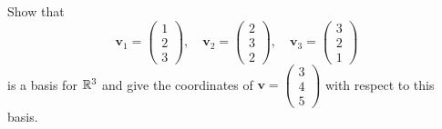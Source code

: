 \documentclass[10pt, a4paper]{article}
\newcommand{\mbf}[1]{\mathbf{#1}}
\begin{document}
\begin{example}
    Show that 
    \[
    \mbf{v}_1 = \begin{pmatrix}
        1 \\ 2 \\ 3
    \end{pmatrix},\quad\mbf{v}_2 = \begin{pmatrix}
        2 \\ 3 \\ 2
    \end{pmatrix},\quad\mbf{v}_3 = \begin{pmatrix}
        3 \\ 2 \\ 1
    \end{pmatrix}
    \]
    is a basis for $\mathbb{R} ^ 3$ and give the coordinates of $\mbf{v} = \begin{pmatrix}
        3 \\ 4 \\ 5
    \end{pmatrix}$ with respect to this basis.


\end{example}
\end{document}
